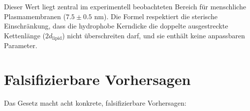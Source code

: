 \documentclass[12pt,a4paper]{article}
\theoremstyle{remark}
\begin{document}
	Dieser Wert liegt zentral im experimentell beobachteten Bereich für menschliche
	Plasmamembranen (\(7.5 \pm 0.5\) nm). Die Formel respektiert die sterische
	Einschränkung, dass die hydrophobe Kerndicke die doppelte ausgestreckte
	Kettenlänge (\(2 d_{\mathrm{lipid}}\)) nicht überschreiten darf, und sie enthält
	keine anpassbaren Parameter.
	
	\section{Falsifizierbare Vorhersagen}
	\label{sec:predictions}
	
	Das Gesetz macht acht konkrete, falsifizierbare Vorhersagen:
	
\end{document}

